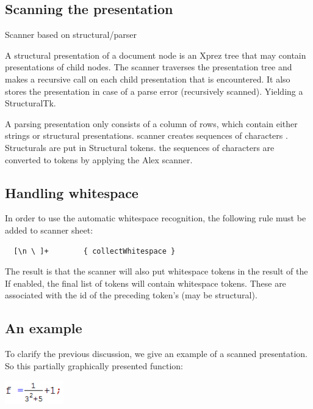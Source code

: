 \documentclass[12pt]{article}
\begin{document}
\subsection{Scanning the presentation}

Scanner based on structural/parser


A structural presentation of a document node is an Xprez tree that may contain presentations of child nodes. The scanner traverses the presentation tree and makes a recursive call on each child presentation that is encountered. It also stores the presentation in case of a parse error (recursively scanned). Yielding a StructuralTk.


A parsing presentation only consists of a column of rows, which contain either strings or structural presentations. scanner creates sequences of characters . Structurals are put in Structural tokens. the sequences of characters are converted to tokens by applying the Alex scanner.


\subsection{Handling whitespace}

In order to use the automatic whitespace recognition, the following rule must be added to scanner sheet:

\begin{footnotesize}
\begin{verbatim}
  [\n \ ]+        { collectWhitespace }
\end{verbatim} %
\end{footnotesize}

The result is that the scanner will also put whitespace tokens in the result of the If enabled, the final list of tokens will contain whitespace tokens. These are associated with the id of the preceding token's (may be structural).


\subsection{An example}

To clarify the previous discussion, we give an example of a scanned presentation. So this partially graphically presented function:
\begin{center}
\includegraphics[width=1in]{images/fraction}
\end{center}
\end{document}
